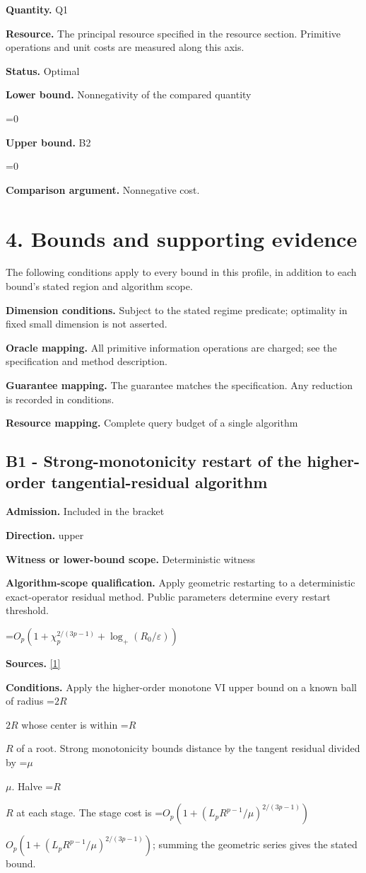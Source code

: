 \documentclass[10pt,a4paper]{article}
\newcommand{\AtlasMath}[1]{\par\begingroup\centering\setbox0=\hbox{$\displaystyle #1$}\ifdim\wd0>1.4\linewidth\typeout{ATLAS WIDE FORMULA: \the\wd0}\fi\ifdim\wd0>\linewidth\resizebox{\linewidth}{!}{\box0}\else\box0\fi\par\endgroup}
\newcommand{\AtlasInlineMath}[1]{\begingroup\setbox0=\hbox{$#1$}\ifdim\wd0>.4\linewidth\endgroup\AtlasMath{#1}\else\endgroup$#1$\fi}
\begin{document}
\textbf{Quantity.} Q1

\textbf{Resource.} The principal resource specified in the resource section. Primitive operations and unit costs are measured along this axis.

\textbf{Status.} Optimal

\textbf{Lower bound.} Nonnegativity of the compared quantity

\AtlasMath{0}
\textbf{Upper bound.} B2

\AtlasMath{0}
\textbf{Comparison argument.} Nonnegative cost.

\section{4. Bounds and supporting evidence}
The following conditions apply to every bound in this profile, in addition to each bound's stated region and algorithm scope.

\textbf{Dimension conditions.} Subject to the stated regime predicate; optimality in fixed small dimension is not asserted.

\textbf{Oracle mapping.} All primitive information operations are charged; see the specification and method description.

\textbf{Guarantee mapping.} The guarantee matches the specification. Any reduction is recorded in conditions.

\textbf{Resource mapping.} Complete query budget of a single algorithm

\subsection{B1 - Strong-monotonicity restart of the higher-order tangential-residual algorithm}
\textbf{Admission.} Included in the bracket

\textbf{Direction.} upper

\textbf{Witness or lower-bound scope.} Deterministic witness

\textbf{Algorithm-scope qualification.} Apply geometric restarting to a deterministic exact-operator residual method. Public parameters determine every restart threshold.

\AtlasMath{O_p\!\left(1+\chi_p^{2/(3p-1)}+\log_+(R_0/\varepsilon)\right)}
\textbf{Sources.} \href{https://arxiv.org/pdf/2609.23557v1}{[1]}

\textbf{Conditions.} Apply the higher-order monotone VI upper bound on a known ball of radius \AtlasInlineMath{2R} whose center is within \AtlasInlineMath{R} of a root. Strong monotonicity bounds distance by the tangent residual divided by \AtlasInlineMath{\mu}. Halve \AtlasInlineMath{R} at each stage. The stage cost is \AtlasInlineMath{O_p(1+(L_pR^{p-1}/\mu)^{2/(3p-1)})}; summing the geometric series gives the stated bound.
\end{document}
